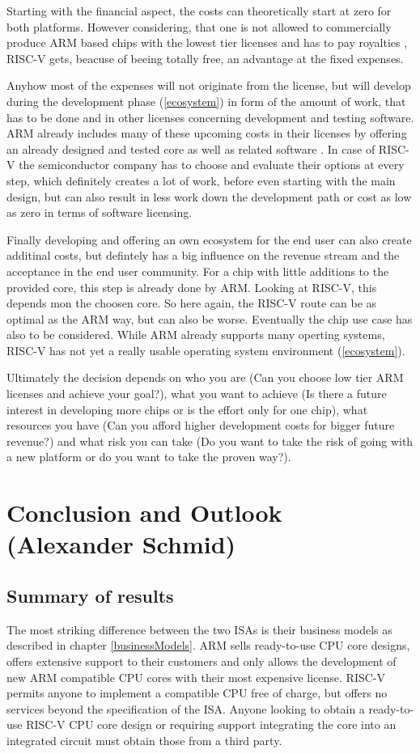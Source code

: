\documentclass[conference]{IEEEtran}
\begin{document}
	Starting with the financial aspect, the costs can theoretically start at zero for both platforms. However considering, that one is not allowed to commercially produce ARM based chips with the lowest tier licenses and has to pay royalties \cite{ARMLC}, RISC-V gets, beacuse of beeing totally free, an advantage at the fixed expenses.

	Anyhow most of the expenses will not originate from the license, but will develop during the development phase (\ref{ecosystem}) in form of the amount of work, that has to be done and in other licenses concerning development and testing software. ARM already includes many of these upcoming costs in their licenses by offering an already designed and tested core as well as related software \cite{ARM2019}. In case of RISC-V the semiconductor company has to choose and evaluate their options at every step, which definitely creates a lot of work, before even starting with the main design, but can also result in less work down the development path or cost as low as zero in terms of software licensing.

	Finally developing and offering an own ecosystem for the end user can also create additinal costs, but defintely has a big influence on the revenue stream and the acceptance in the end user community. For a chip with little additions to the provided core, this step is already done by ARM. Looking at RISC-V, this depends mon the choosen core. So here again, the RISC-V route can be as optimal as the ARM way, but can also be worse. Eventually the chip use case has also to be considered. While ARM already supports many operting systems, RISC-V has not yet a really usable operating system environment (\ref{ecosystem}).

	Ultimately the decision depends on who you are (Can you choose low tier ARM licenses and achieve your goal?), what you want to achieve (Is there a future interest in developing more chips or is the effort only for one chip), what resources you have (Can you afford higher development costs for bigger future revenue?) and what risk you can take (Do you want to take the risk of going with a new platform or do you want to take the proven way?).


\section{Conclusion and Outlook (Alexander Schmid)}
\label{ref:conclusion}
	\subsection{Summary of results}
	The most striking difference between the two \glspl{ISA} is their business models as described in chapter \ref{businessModels}.
	ARM sells ready-to-use \gls{CPU} core designs, offers extensive support to their customers and only allows the development of new
	ARM compatible \gls{CPU} cores with their most expensive license.
	RISC-V permits anyone to implement a compatible \gls{CPU} free of charge, but offers no services beyond the specification of the \gls{ISA}.
	Anyone looking to obtain a ready-to-use RISC-V \gls{CPU} core design or requiring support integrating the core into an integrated circuit
	must obtain those from a third party.
\end{document}
